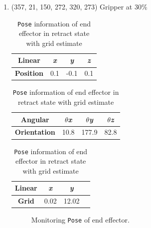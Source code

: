 \documentclass[12pt]{article}
\begin{document}
\begin{enumerate}
\begin{enumerate}
    \item (357, 21, 150, 272, 320, 273) Gripper at 30\%
    
    \begin{table}[H]
        \caption{\texttt{Pose} information of end effector in retract state with grid estimate}
        \begin{subtable}{.3\linewidth}
            \centering
            \begin{tabular}{cccc}
                \toprule
                \textbf{Linear} & \textit{x} & \textit{y} & \textit{z} \\\midrule
                \textbf{Position} & 0.1 & -0.1 & 0.1 \\\bottomrule
            \end{tabular}
        \end{subtable}
        \begin{subtable}{.4\linewidth}
            \centering
            \begin{tabular}{cccc}
                \toprule
                \textbf{Angular} & \textit{$\theta$x} & \textit{$\theta$y} & \textit{$\theta$z} \\\midrule
                \textbf{Orientation} & 10.8 & 177.9 & 82.8 \\\bottomrule
            \end{tabular}
        \end{subtable}
        \begin{subtable}{.25\linewidth}
            \centering
            \begin{tabular}{cccc}
                \toprule
                \textbf{Linear} & \textit{x} & \textit{y} \\\midrule
                \textbf{Grid} & 0.02 & 12.02 \\\bottomrule
            \end{tabular}
        \end{subtable}
    \end{table}

    \begin{figure}[h]
        \centering
        \hfill
        \caption{Monitoring \texttt{Pose} of end effector.}
        \label{fig:custom_arm}\vspace{-10pt}
    \end{figure}


\end{enumerate}
\end{enumerate}
\end{document}
